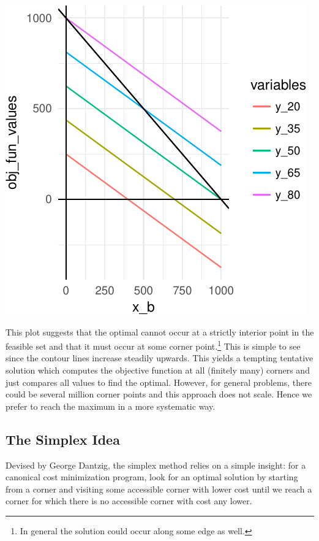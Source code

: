 \documentclass[11pt,]{article}
\let\rmarkdownfootnote\footnote%
\def\footnote{\protect\rmarkdownfootnote}
\begin{document}
\includegraphics{Linear_Programming_files/figure-latex/plot_contour-1.pdf}

This plot suggests that the optimal cannot occur at a strictly interior
point in the feasible set and that it must occur at some corner
point.\footnote{In general the solution could occur along some edge as
  well.} This is simple to see since the contour lines increase steadily
upwards. This yields a tempting tentative solution which computes the
objective function at all (finitely many) corners and just compares all
values to find the optimal. However, for general problems, there could
be several million corner points and this approach does not scale. Hence
we prefer to reach the maximum in a more systematic way.

\subsection{The Simplex Idea}\label{the-simplex-idea}

Devised by George Dantzig, the simplex method relies on a simple
insight: for a canonical cost minimization program, look for an optimal
solution by starting from a corner and visiting some accessible corner
with lower cost until we reach a corner for which there is no accessible
corner with cost any lower.
\end{document}
